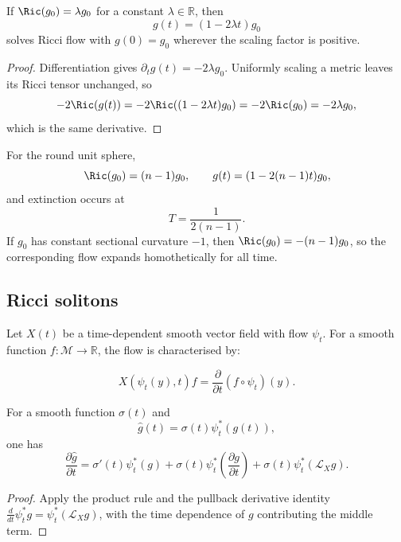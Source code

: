 \begin{remark}
\label{topping-intro-einstein-flow}
If $\Ric(g_0)=\lambda g_0$ for a constant $\lambda\in\mathbb R$, then
\[
g(t)=(1-2\lambda t)g_0
\]
solves Ricci flow with $g(0)=g_0$ wherever the scaling factor is positive.
\end{remark}

\begin{proof}
\sketch Differentiation gives $\partial_tg(t)=-2\lambda g_0$. Uniformly
scaling a metric leaves its Ricci tensor unchanged, so
\[
-2\Ric(g(t))=-2\Ric((1-2\lambda t)g_0)=-2\Ric(g_0)=-2\lambda g_0,
\]
which is the same derivative.
\end{proof}

For the round unit sphere,
\[
\Ric(g_0)=(n-1)g_0,
\qquad
g(t)=(1-2(n-1)t)g_0,
\]
and extinction occurs at
\[
T=\frac{1}{2(n-1)}.
\]
If $g_0$ has constant sectional curvature $-1$, then
$\Ric(g_0)=-(n-1)g_0$, so the corresponding flow expands homothetically for
all time.

\subsection{Ricci solitons}

Let $X(t)$ be a time-dependent smooth vector field with flow $\psi_t$. For a
smooth function $f:\mathcal M\to\mathbb R$, the flow is characterised by:

\begin{definition}
\label{topping-intro-flow-field}
\[
X(\psi_t(y),t)f=\frac{\partial}{\partial t}(f\circ\psi_t)(y).
\]
\end{definition}

\begin{proposition}
\label{topping-intro-pushforward-evolution}

For a smooth function $\sigma(t)$ and
\[
\hat g(t)=\sigma(t)\psi_t^*(g(t)),
\]
one has
\[
\frac{\partial \hat g}{\partial t}
=\sigma'(t)\psi_t^*(g)
+\sigma(t)\psi_t^*\!\left(\frac{\partial g}{\partial t}\right)
+\sigma(t)\psi_t^*(\mathcal L_Xg).
\]
\end{proposition}

\begin{proof}
\sketch Apply the product rule and the pullback derivative identity
$\frac{d}{dt}\psi_t^*g=\psi_t^*(\mathcal L_Xg)$, with the time dependence of
$g$ contributing the middle term.
\end{proof}


